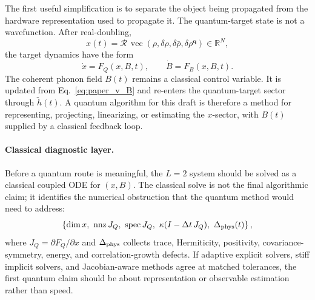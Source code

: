 \documentclass[
  reprint,
  amsmath,
  amssymb,
  aps,
  pra,
  nofootinbib,
  superscriptaddress,
  floatfix
]{revtex4-2}
\begin{document}
The first useful simplification is to separate the object being propagated from
the hardware representation used to propagate it.  The quantum-target state is
not a wavefunction.  After real-doubling,
\begin{equation}
x(t)=\mathcal R\,\operatorname{vec}
\left(
\rho,\delta\rho,\delta\bar\rho,\delta\rho^{\mathbf q}
\right)
\in\mathbb R^N ,
\end{equation}
the target dynamics have the form
\begin{equation}
\dot x=F_Q(x,B,t),
\qquad
\dot B=F_B(x,B,t).
\end{equation}
The coherent phonon field \(B(t)\) remains a classical control variable.  It is
updated from Eq.~\eqref{eq:paper_v_B} and re-enters the quantum-target sector
through \(\tilde h(t)\).  A quantum algorithm for this draft is therefore a
method for representing, projecting, linearizing, or estimating the
\(x\)-sector, with \(B(t)\) supplied by a classical feedback loop.

\paragraph*{Classical diagnostic layer.}
Before a quantum route is meaningful, the \(L=2\) system should be solved as a
classical coupled ODE for \((x,B)\).  The classical solve is not the final
algorithmic claim; it identifies the numerical obstruction that the quantum
method would need to address:
\begin{equation}
\left\{
\dim x,\ \operatorname{nnz} J_Q,\ 
\operatorname{spec} J_Q,\ 
\kappa(I-\Delta t\,J_Q),\
\Delta_{\rm phys}(t)
\right\},
\end{equation}
where \(J_Q=\partial F_Q/\partial x\) and \(\Delta_{\rm phys}\) collects trace,
Hermiticity, positivity, covariance-symmetry, energy, and correlation-growth
defects.  If adaptive explicit solvers, stiff implicit solvers, and
Jacobian-aware methods agree at matched tolerances, the first quantum claim
should be about representation or observable estimation rather than speed.
\end{document}
